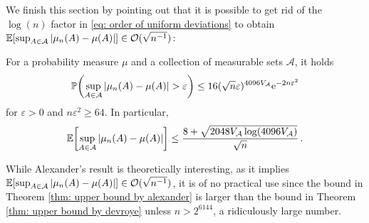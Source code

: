 We finish this section by pointing out that it is possible to get rid of the $\log(n)$ factor in \eqref{eq: order of uniform deviations} to obtain $\operatorname{\mathbb{E}}[\sup_{A \in \mathcal{A}} \abs{\mu_n(A) - \mu(A)}] \in \mathcal{O}(\sqrt{n^{-1}})$:

\begin{theorem}[Alexander, 1984]
\label{thm: upper bound by alexander}
For a probability measure $\mu$ and a collection of measurable sets $\mathcal{A}$, it holds
\[
    \Prob\left(\sup_{A \in \mathcal{A}} \abs{\mu_n(A) - \mu(A)} > \varepsilon\right) \leq 16 (\sqrt{n} \varepsilon)^{4096 V_{\mathcal{A}}} \e^{-2n\varepsilon^2}
\]
for $\varepsilon > 0$ and $n \varepsilon^2 \geq 64$. In particular,
\[
    \Exp\left[\sup_{A \in \mathcal{A}} \abs{\mu_n(A) - \mu(A)}\right] \leq \frac{8 + \sqrt{2048 V_{\mathcal{A}} \log(4096 V_{\mathcal{A}})}}{\sqrt{n}} \, .
\]
\end{theorem}

While Alexander's result is theoretically interesting, as it implies $\operatorname{\mathbb{E}}[\sup_{A \in \mathcal{A}} \abs{\mu_n(A) - \mu(A)}] \in \mathcal{O}(\sqrt{n^{-1}})$, it is of no practical use since the bound in Theorem \ref{thm: upper bound by alexander} is larger than the bound in Theorem \ref{thm: upper bound by devroye} unless $n > 2^{6144}$, a ridiculously large number.
